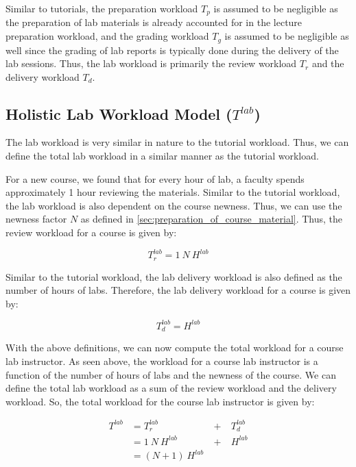 Similar to tutorials, the preparation workload \(T_p\) is assumed to be negligible as the preparation of lab materials is already accounted for in the lecture preparation workload, and the grading workload \(T_g\) is assumed to be negligible as well since the grading of lab reports is typically done during the delivery of the lab sessions. Thus, the lab workload is primarily the review workload \(T_r\) and the delivery workload \(T_d\).

\subsection{Holistic Lab Workload Model (\texorpdfstring{\(T^{lab}\)}{})}

The lab workload is very similar in nature to the tutorial workload. Thus, we can define the total lab workload in a similar manner as the tutorial workload.

For a new course, we found that for every hour of lab, a faculty spends approximately 1 hour reviewing the materials. Similar to the tutorial workload, the lab workload is also dependent on the course newness. Thus, we can use the newness factor \(N\) as defined in \autoref{sec:preparation_of_course_material}. Thus, the review workload for a course is given by:

\begin{equation}
  \label{eqn:lab-review-workload}
  T_r^{lab} = 1\ N \ H^{lab}
\end{equation}

Similar to the tutorial workload, the lab delivery workload is also defined as the number of hours of labs. Therefore, the lab delivery workload for a course is given by:

\begin{equation}
  \label{eqn:lab-delivery-workload}
  T_d^{lab} = H^{lab}
\end{equation}

With the above definitions, we can now compute the total workload for a course lab instructor. As seen above, the workload for a course lab instructor is a function of the number of hours of labs and the newness of the course. We can define the total lab workload as a sum of the review workload and the delivery workload. So, the total workload for the course lab instructor is given by:

\begin{equation}
  \begin{aligned}
    T^{lab} & = T_r^{lab}        & \ +\  & T_d^{lab} \\
            & = 1\ N\ H^{lab}    & \ +\  & H^{lab}   \\
            & = (N + 1)\ H^{lab}
  \end{aligned}
  \label{eqn:lab-workload}
\end{equation}

